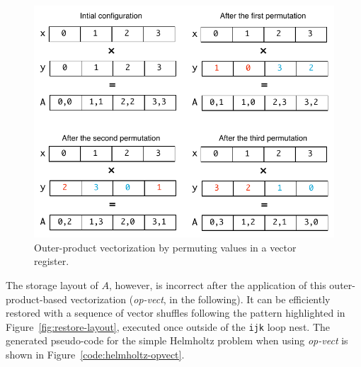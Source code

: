\documentclass[conference]{IEEEtran}
\begin{document}

\begin{figure}[h]
\centerline{\includegraphics[scale=0.6]{Pictures/vect-by-vect.pdf}}
\caption{Outer-product vectorization by permuting values in a vector register.}
\label{fig:vect-by-vect}
\end{figure}

The storage layout of $A$, however, is incorrect after the application of this outer-product-based vectorization (\emph{op-vect}, in the following). It can be efficiently restored with a sequence of vector shuffles following the pattern highlighted in Figure~\ref{fig:restore-layout}, executed once outside of the \texttt{ijk} loop nest. The generated pseudo-code for the simple Helmholtz problem when using \emph{op-vect} is shown in Figure~\ref{code:helmholtz-opvect}.
\end{document}
